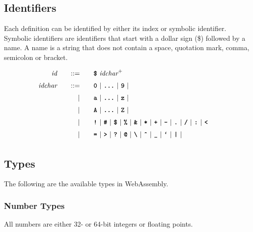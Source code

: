 \subsection{Identifiers}

Each definition can be identified by either its index or symbolic identifier. Symbolic identifiers are identifiers that start with a dollar sign (\$) followed by a name. A name is a string that does not contain a space, quotation mark, comma, semicolon or bracket.

\begin{alignat*}{9}
    && \textit{id}    &&\quad ::= &\quad && \textbf{\texttt{\$}}\ \textit{idchar}^+  \quad && \\[1mm]
    && \textit{idchar}    &&\quad ::= &\quad && \textbf{\texttt{0}}\ |\ \textbf{\texttt{\dots}}\ |\ \textbf{\texttt{9}}\ |  \quad && \\[1mm]
    &&                    &&\quad  |  &\quad && \textbf{\texttt{a}}\ |\ \textbf{\texttt{\dots}}\ |\ \textbf{\texttt{z}}\ |  \quad && \\[1mm]
    &&                    &&\quad  |  &\quad && \textbf{\texttt{A}}\ |\ \textbf{\texttt{\dots}}\ |\ \textbf{\texttt{Z}}\ |  \quad && \\[1mm]
    &&                    &&\quad  |  &\quad && \textbf{\texttt{!}}\ |\ \textbf{\texttt{\#}}\ |\ \textbf{\texttt{\$}}\ |\ \textbf{\texttt{\%}}\ |\ \textbf{\texttt{\&}}\ |\ \textbf{\texttt{*}}\ |\ \textbf{\texttt{+}}\ |\ \textbf{\texttt{-}}\ |\ \textbf{\texttt{.}}\ |\ \textbf{\texttt{/}}\ |\ \textbf{\texttt{:}}\ |\ \textbf{\texttt{<}}\  \quad && \\[1mm]
    &&                    &&\quad  |  &\quad && \textbf{\texttt{=}}\ |\ \textbf{\texttt{>}}\ |\ \textbf{\texttt{?}}\ |\ \textbf{\texttt{@}}\ |\ \textbf{\texttt{\textbackslash}}\ |\ \textbf{\texttt{\^}}\ |\ \textbf{\texttt{\_}}\ |\ \textbf{\texttt{`}}\ |\ \textbf{\texttt{|}}\ |\ \textbf{\texttt{~}}\  \quad && \\[1mm]
\end{alignat*}

\subsection{Types}
The following are the available types in WebAssembly.
\subsubsection{Number Types}
All numbers are either 32- or 64-bit integers or floating points.

